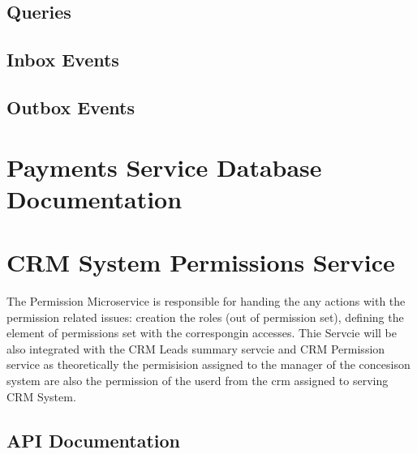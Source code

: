 \documentclass[letterpaper,10pt,english]{sphinxmanual}
\begin{document}
\subsection{Queries}
\label{\detokenize{crm_system/payments_service:queries}}

\subsection{Inbox Events}
\label{\detokenize{crm_system/payments_service:inbox-events}}

\subsection{Outbox Events}
\label{\detokenize{crm_system/payments_service:outbox-events}}

\section{Payments Service Database Documentation}
\label{\detokenize{crm_system/payments_service:payments-service-database-documentation}}
\sphinxstepscope


\section{CRM System Permissions Service}
\label{\detokenize{crm_system/permissions_service:crm-system-permissions-service}}\label{\detokenize{crm_system/permissions_service::doc}}
\sphinxAtStartPar
The Permission Microservice is responsible for handing the any actions with the permission related issues: creation the roles (out of permission set), defining the element of permissions set with the correspongin accesses. Thie Servcie will be also integrated with the CRM Leads summary servcie and CRM Permission service as theoretically the permisision assigned to the manager of the concesison system are also the permission of the userd from the crm assigned to serving CRM System.



\subsection{API Documentation}
\label{\detokenize{crm_system/permissions_service:api-documentation}}
\end{document}
